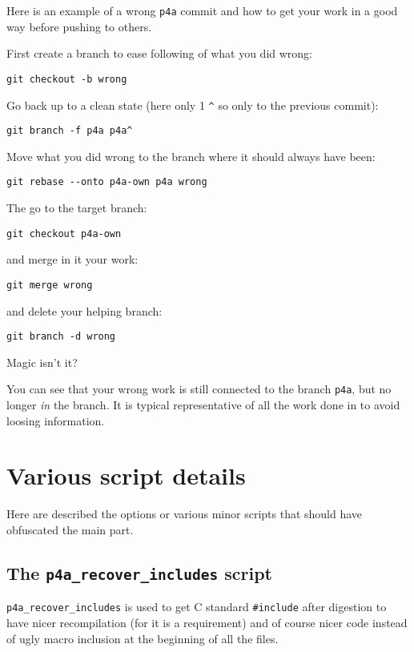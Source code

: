 \documentclass[a4paper]{article}
\begin{document}
Here is an example of a wrong \texttt{p4a} commit and how to get your work
in a good way before pushing to others.

First create a branch to ease following of what you did wrong:
\begin{verbatim}
git checkout -b wrong
\end{verbatim}
Go back up to a clean state (here only 1 \verb|^| so only to the previous
commit):
\begin{verbatim}
git branch -f p4a p4a^
\end{verbatim}
Move what you did wrong to the branch where it should always have been:
\begin{verbatim}
git rebase --onto p4a-own p4a wrong
\end{verbatim}
The go to the target branch:
\begin{verbatim}
git checkout p4a-own
\end{verbatim}
and merge in it your work:
\begin{verbatim}
git merge wrong
\end{verbatim}
and delete your helping branch:
\begin{verbatim}
git branch -d wrong
\end{verbatim}
Magic isn't it? \smiley

You can see that your wrong work is still connected to the branch
\texttt{p4a}, but no longer \emph{in} the branch. It is typical
representative of all the work done in \Apfa to avoid loosing information.


\appendix

\section{Various script details}
\label{sec:vari-script-deta}

Here are described the options or various minor scripts that should have
obfuscated the main part.

\subsection{The \protect\texttt{p4a\_recover\_includes} script}
\label{sec:p4a_recover_includes}

\verb|p4a_recover_includes| is used to get C standard \verb|#include|
after \Apips digestion to have nicer recompilation (for \Acuda it is a
requirement) and of course nicer code instead of ugly macro inclusion at
the beginning of all the files.
\end{document}
